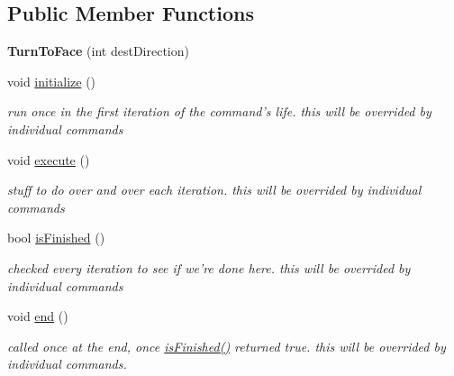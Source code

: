 \subsection*{Public Member Functions}
\begin{DoxyCompactItemize}
\item 
\hypertarget{classTurnToFace_ada3a9e946f131ad12ce46373dbd38890}{{\bfseries Turn\-To\-Face} (int dest\-Direction)}\label{classTurnToFace_ada3a9e946f131ad12ce46373dbd38890}

\item 
\hypertarget{classTurnToFace_a4e4583374430f20b1104fdc177275cf7}{void \hyperlink{classTurnToFace_a4e4583374430f20b1104fdc177275cf7}{initialize} ()}\label{classTurnToFace_a4e4583374430f20b1104fdc177275cf7}

\begin{DoxyCompactList}\small\item\em run once in the first iteration of the command's life. this will be overrided by individual commands \end{DoxyCompactList}\item 
\hypertarget{classTurnToFace_a7b051988a247f6be7cfaaebe09215c78}{void \hyperlink{classTurnToFace_a7b051988a247f6be7cfaaebe09215c78}{execute} ()}\label{classTurnToFace_a7b051988a247f6be7cfaaebe09215c78}

\begin{DoxyCompactList}\small\item\em stuff to do over and over each iteration. this will be overrided by individual commands \end{DoxyCompactList}\item 
bool \hyperlink{classTurnToFace_afd6933d5eca23dcd3c4f95c7528c6fe6}{is\-Finished} ()
\begin{DoxyCompactList}\small\item\em checked every iteration to see if we're done here. this will be overrided by individual commands \end{DoxyCompactList}\item 
\hypertarget{classTurnToFace_a13de7c83710f05d7343b85ba73522f27}{void \hyperlink{classTurnToFace_a13de7c83710f05d7343b85ba73522f27}{end} ()}\label{classTurnToFace_a13de7c83710f05d7343b85ba73522f27}

\begin{DoxyCompactList}\small\item\em called once at the end, once \hyperlink{classTurnToFace_afd6933d5eca23dcd3c4f95c7528c6fe6}{is\-Finished()} returned true. this will be overrided by individual commands. \end{DoxyCompactList}\end{DoxyCompactItemize}

